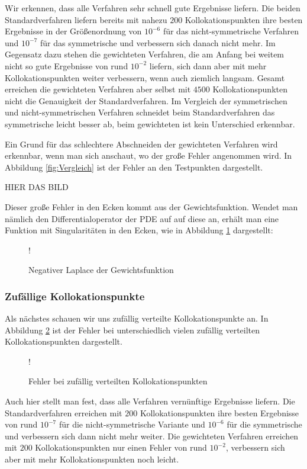 Wir erkennen, dass alle Verfahren sehr schnell gute Ergebnisse liefern. Die beiden Standardverfahren liefern bereits mit nahezu $200$ Kollokationspunkten ihre besten Ergebnisse in der Größenordnung von $10^{-6}$ für das nicht-symmetrische Verfahren und $10^{-7}$ für das symmetrische und verbessern sich danach nicht mehr. Im Gegensatz dazu stehen die gewichteten Verfahren, die am Anfang bei weitem nicht so gute Ergebnisse von rund $10^{-2}$ liefern, sich dann aber mit mehr Kollokationspunkten weiter verbessern, wenn auch ziemlich langsam. Gesamt erreichen die gewichteten Verfahren aber selbst mit $4500$ Kollokationspunkten nicht die Genauigkeit der Standardverfahren. Im Vergleich der symmetrischen und nicht-symmetrischen Verfahren schneidet beim Standardverfahren das symmetrische leicht besser ab, beim gewichteten ist kein Unterschied erkennbar.

Ein Grund für das schlechtere Abschneiden der gewichteten Verfahren wird erkennbar, wenn man sich anschaut, wo der große Fehler angenommen wird. In Abbildung \ref{fig:Vergleich} ist der Fehler an den Testpunkten dargestellt.

HIER DAS BILD

Dieser große Fehler in den Ecken kommt aus der Gewichtsfunktion. Wendet man nämlich den Differentialoperator der \ac{PDE} auf auf diese an, erhält man eine Funktion mit Singularitäten in den Ecken, wie in Abbildung \ref{fig:Gewicht} dargestellt:
\begin{figure}[ht]
\centering
\resizebox {\columnwidth} {!} {

}
\caption{Negativer Laplace der Gewichtsfunktion}
\label{fig:Gewicht}
\end{figure}
\subsubsection{Zufällige Kollokationspunkte}
Als nächstes schauen wir uns zufällig verteilte Kollokationspunkte an. In Abbildung \ref{fig:error-random} ist der Fehler bei unterschiedlich vielen zufällig verteilten Kollokationspunkten dargestellt.
\begin{figure}[ht]
\centering
\resizebox {\columnwidth} {!} {

}
\caption{Fehler bei zufällig verteilten Kollokationspunkten}
\label{fig:error-random}
\end{figure}

Auch hier stellt man fest, dass alle Verfahren vernünftige Ergebnisse liefern. Die Standardverfahren erreichen mit $200$ Kollokationspunkten ihre besten Ergebnisse von rund $10^{-7}$ für die nicht-symmetrische Variante und $10^{-6}$ für die symmetrische und verbessern sich dann nicht mehr weiter. Die gewichteten Verfahren erreichen mit $200$ Kollokationspunkten nur einen Fehler von rund $10^{-2}$, verbessern sich aber mit mehr Kollokationspunkten noch leicht.

